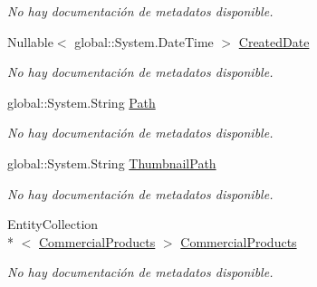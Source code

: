 \begin{DoxyCompactItemize}
\begin{DoxyCompactList}\small\item\em No hay documentación de metadatos disponible. \end{DoxyCompactList}\item 
Nullable$<$ global\-::\-System.\-Date\-Time $>$ \hyperlink{class_microsoft_1_1_samples_1_1_kinect_1_1_basic_interactions_1_1_product_images_a3289216b263b856ebdd7d63896f7768c}{Created\-Date}
\begin{DoxyCompactList}\small\item\em No hay documentación de metadatos disponible. \end{DoxyCompactList}\item 
global\-::\-System.\-String \hyperlink{class_microsoft_1_1_samples_1_1_kinect_1_1_basic_interactions_1_1_product_images_aa9e01755cd29d37c1a62f50068005af6}{Path}
\begin{DoxyCompactList}\small\item\em No hay documentación de metadatos disponible. \end{DoxyCompactList}\item 
global\-::\-System.\-String \hyperlink{class_microsoft_1_1_samples_1_1_kinect_1_1_basic_interactions_1_1_product_images_a5704c72d2877381606844aceac5188d8}{Thumbnail\-Path}
\begin{DoxyCompactList}\small\item\em No hay documentación de metadatos disponible. \end{DoxyCompactList}\item 
Entity\-Collection\\*
$<$ \hyperlink{class_microsoft_1_1_samples_1_1_kinect_1_1_basic_interactions_1_1_commercial_products}{Commercial\-Products} $>$ \hyperlink{class_microsoft_1_1_samples_1_1_kinect_1_1_basic_interactions_1_1_product_images_aa4491d13d699bf2a309bc6f0bceb8772}{Commercial\-Products}
\begin{DoxyCompactList}\small\item\em No hay documentación de metadatos disponible. \end{DoxyCompactList}\end{DoxyCompactItemize}


